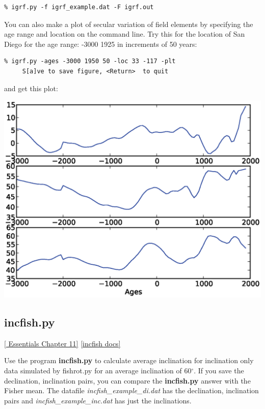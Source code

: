 \documentclass[11pt]{book}
\begin{document}
{{{\begin{verbatim}
% igrf.py -f igrf_example.dat -F igrf.out
\end{verbatim}

You can also make a plot of secular variation of field elements by specifying the age range and location on the command line.  Try this for the location of San Diego for the age range: -3000 1925 in increments of 50 years:

\begin{verbatim}
% igrf.py -ages -3000 1950 50 -loc 33 -117 -plt
     S[a]ve to save figure, <Return>  to quit
\end{verbatim}

and get this plot: 


  \includegraphics[width=15cm]{EPSfiles/igrf.eps}


\subsection{incfish.py}
\href{http://magician.ucsd.edu/Essentials_2/WebBook2ch11.html#ch11}{ [ Essentials Chapter 11]}
\href{http://earthref.org/PmagPy/pmagpydocs/incfish-module.html}{[incfish docs]}

Use the program {\bf incfish.py} to calculate average inclination for inclination only data 
simulated by fishrot.py for an average inclination of 60$^{\circ}$.   If you save the declination, inclination 
pairs, you can compare the {\bf incfish.py} answer with the Fisher mean.    The datafile {\it incfish\_example\_di.dat} has the declination, inclination pairs and {\it incfish\_example\_inc.dat} has just the inclinations.  

}}}
\end{document}
